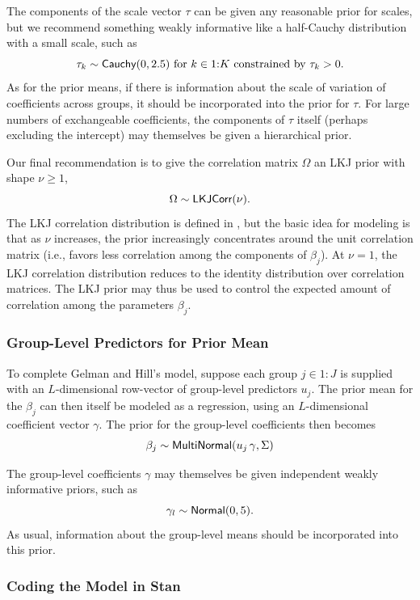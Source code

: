 The components of the scale vector $\tau$ can be given any reasonable
prior for scales, but we recommend something weakly informative like a
half-Cauchy distribution with a small scale, such as
\[
\tau_k \sim \distro{Cauchy}(0, 2.5) 
\mbox{ for } k \in 1{:}K \mbox{ constrained by } \tau_k > 0.
\]
As for the prior means, if there is information about the scale of
variation of coefficients across groups, it should be incorporated
into the prior for $\tau$.  For large numbers of exchangeable
coefficients, the components of $\tau$ itself (perhaps excluding the
intercept) may themselves be given a hierarchical prior.

Our final recommendation is to give the correlation matrix $\Omega$ an
LKJ prior with shape $\nu \geq 1$,
\[
\Omega \sim \distro{LKJCorr}(\nu).
\]
The LKJ correlation distribution is defined in
, but the basic idea for modeling is that
as $\nu$ increases, the prior increasingly concentrates around the
unit correlation matrix (i.e., favors less correlation among the
components of $\beta_{j}$).  At $\nu = 1$, the LKJ correlation
distribution reduces to the identity distribution over correlation
matrices.  The LKJ prior may thus be used to control the expected
amount of correlation among the parameters $\beta_j$.

\subsubsection{Group-Level Predictors for Prior Mean}

To complete Gelman and Hill's model, suppose each group $j \in 1{:}J$
is supplied with an $L$-dimensional row-vector of group-level
predictors $u_j$.  The prior mean for the $\beta_j$ can then itself be
modeled as a regression, using an $L$-dimensional coefficient vector
$\gamma$.  The prior for the group-level coefficients then becomes
\[
\beta_j \sim \distro{MultiNormal}(u_j \, \gamma, \Sigma)
\]

The group-level coefficients $\gamma$ may themselves be given
independent weakly informative priors, such as
\[
\gamma_l \sim \distro{Normal}(0,5).
\] 
As usual, information about the group-level means should be
incorporated into this prior.


\subsubsection{Coding the Model in Stan}

